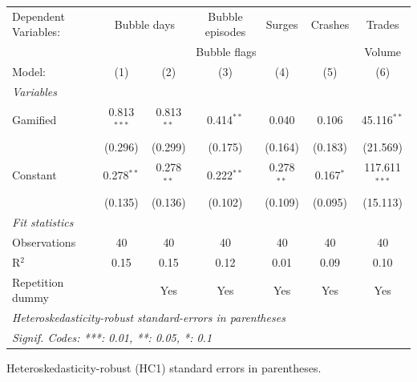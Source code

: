 \begingroup
\centering
\begin{tabular}{lcccccc}
   \tabularnewline \midrule \midrule
   Dependent Variables: & \multicolumn{2}{c}{Bubble days} & Bubble episodes & Surges & Crashes & Trades\\
    & \multicolumn{5}{c}{Bubble flags} & Volume \\ 
   Model:           & (1)           & (2)          & (3)          & (4)          & (5)         & (6)\\  
   \midrule
   \emph{Variables}\\
   Gamified         & 0.813$^{***}$ & 0.813$^{**}$ & 0.414$^{**}$ & 0.040        & 0.106       & 45.116$^{**}$\\   
                    & (0.296)       & (0.299)      & (0.175)      & (0.164)      & (0.183)     & (21.569)\\   
   Constant         & 0.278$^{**}$  & 0.278$^{**}$ & 0.222$^{**}$ & 0.278$^{**}$ & 0.167$^{*}$ & 117.611$^{***}$\\   
                    & (0.135)       & (0.136)      & (0.102)      & (0.109)      & (0.095)     & (15.113)\\   
   \midrule
   \emph{Fit statistics}\\
   Observations     & 40            & 40           & 40           & 40           & 40          & 40\\  
   R$^2$            & 0.15          & 0.15         & 0.12         & 0.01         & 0.09        & 0.10\\  
   Repetition dummy &               & Yes          & Yes          & Yes          & Yes         & Yes\\  
   \midrule \midrule
   \multicolumn{7}{l}{\emph{Heteroskedasticity-robust standard-errors in parentheses}}\\
   \multicolumn{7}{l}{\emph{Signif. Codes: ***: 0.01, **: 0.05, *: 0.1}}\\
\end{tabular}
 
\par \raggedright 
Heteroskedasticity-robust (HC1) standard errors in parentheses.
\par\endgroup
